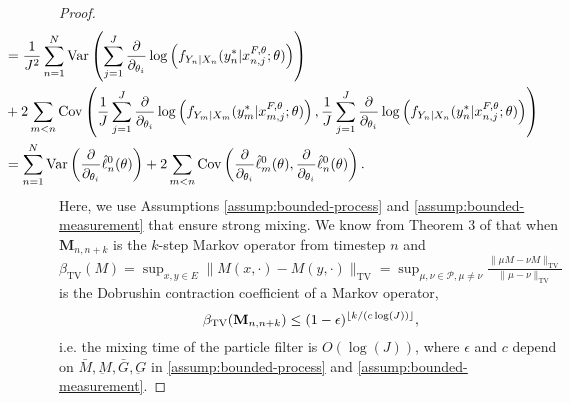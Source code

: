 \begin{proof}
\begin{align}
    & \hspace{-20mm}= \frac{1}{J^2}\sum_{n=1}^N\Var\left(\sum_{j=1}^{J}\frac{\partial}{\partial_{\theta_i}} \log\left(f_{Y_n|X_{n}}(y_n^*|x_{n,j}^{F, \theta}; \theta)\right)\right) \\
    &\hspace{-20mm}+ 2\sum_{m<n}\Cov\left(\frac{1}{J}\sum_{j=1}^{J}\frac{\partial}{\partial_{\theta_i}} \log\left(f_{Y_m|X_{m}}(y_m^*|x_{m,j}^{F, \theta}; \theta)\right), \frac{1}{J}\sum_{j=1}^{J}\frac{\partial}{\partial_{\theta_i}} \log\left(f_{Y_n|X_{n}}(y_n^*|x_{n,j}^{F, \theta}; \theta)\right)\right) \\
    &\hspace{-20mm}= \sum_{n=1}^N \Var\left(\frac{\partial}{\partial_{\theta_i}}\hat\ell_n^0(\theta)\right) + 2\sum_{m<n} \Cov\left(\frac{\partial}{\partial_{\theta_i}}\hat\ell_m^0(\theta),\frac{\partial}{\partial_{\theta_i}}\hat\ell_n^0(\theta)\right).
\end{align}
Here, we use Assumptions \ref{assump:bounded-process} and \ref{assump:bounded-measurement} that ensure strong mixing. We know from Theorem 3 of \cite{karjalainen23} that when $\textbf{M}_{n,n+k}$ is the $k$-step Markov operator from timestep $n$ and $\beta_{\text{TV}}(M) = \sup _{x, y \in E}\|M(x, \cdot)-M(y, \cdot)\|_{\mathrm{TV}}=\sup _{\mu, \nu \in \mathcal{P}, \mu \neq \nu} \frac{\|\mu M-\nu M\|_{\mathrm{TV}}}{\|\mu-\nu\|_{\mathrm{TV}}}$ is the Dobrushin contraction coefficient of a Markov operator, 
\begin{equation}
\beta_{\text{TV}}(\textbf{M}_{n,n+k}) \leq (1-\epsilon)^{\lfloor k/(c\log(J)) \rfloor},
\end{equation}
i.e. the mixing time of the particle filter is $O(\log(J))$, where $\epsilon$ and $c$ depend on $\bar{M}, \underbar{M}, \bar{G}, \underbar{G}$ in \ref{assump:bounded-process} and \ref{assump:bounded-measurement}. 



\end{proof}
